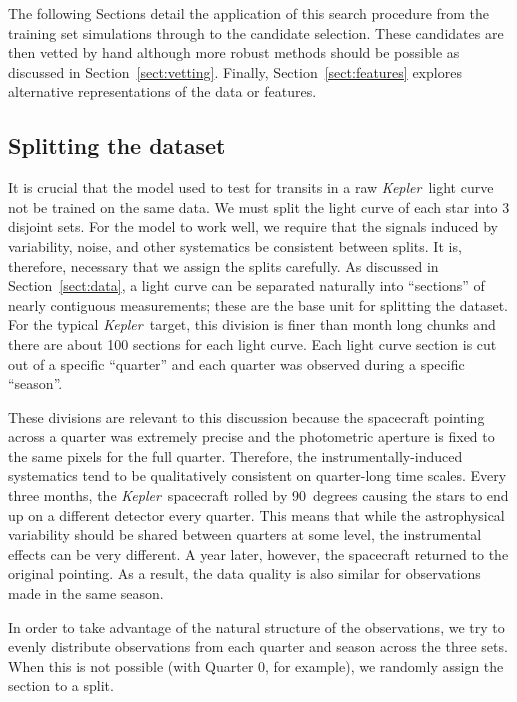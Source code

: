 \documentclass[12pt,preprint]{aastex}
\newcommand{\project}[1]{\textsl{#1}}
\newcommand{\kepler}{\project{Kepler}}
\newcommand{\sectionname}{Section}
\newcommand{\sectref}[1]{\ref{sect:#1}}
\newcommand{\Sect}[1]{\sectionname~\sectref{#1}}
\newcommand{\sect}[1]{\Sect{#1}}
\newcommand{\sectlabel}[1]{\label{sect:#1}}
\begin{document}
The following \sectionname s detail the application of this search procedure
from the training set simulations through to the candidate selection.
These candidates are then vetted by hand although more robust methods should
be possible as discussed in \sect{vetting}.
Finally, \sect{features} explores alternative representations of the data or
features.


\subsection{Splitting the dataset}\sectlabel{split}

It is crucial that the model used to test for transits in a raw \kepler\
light curve not be trained on the same data.
We must split the light curve of each star into 3 disjoint sets.
For the model to work well, we require that the signals induced by
variability, noise, and other systematics be consistent between splits.
It is, therefore, necessary that we assign the splits carefully.
As discussed in \sect{data}, a light curve can be separated naturally into
``sections'' of nearly contiguous measurements; these are the base unit for
splitting the dataset.
For the typical \kepler\ target, this division is finer than month long
chunks and there are about 100 sections for each light curve.
Each light curve section is cut out of a specific ``quarter'' and each quarter
was observed during a specific ``season''.

These divisions are relevant to this discussion because the spacecraft
pointing across a quarter was extremely precise and the photometric aperture
is fixed to the same pixels for the full quarter.
Therefore, the instrumentally-induced systematics tend to be qualitatively
consistent on quarter-long time scales.
Every three months, the \kepler\ spacecraft rolled by 90~degrees causing the
stars to end up on a different detector every quarter.
This means that while the astrophysical variability should be shared between
quarters at some level, the instrumental effects can be very different.
A year later, however, the spacecraft returned to the original pointing.
As a result, the data quality is also similar for observations made in the
same season.

In order to take advantage of the natural structure of the observations, we
try to evenly distribute observations from each quarter and season across the
three sets.
When this is not possible (with Quarter 0, for example), we randomly assign
the section to a split.
\end{document}
